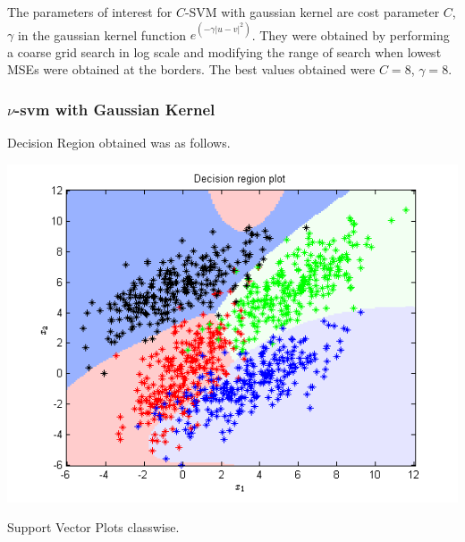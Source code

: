 \documentclass{article}
\begin{document}
The parameters of interest for $C$-SVM with gaussian kernel are cost parameter $C$, $\gamma$ in the gaussian kernel function $e^{(-\gamma|u-v|^{2})}$. They were obtained by performing a coarse grid search in log scale and modifying the range of search when lowest MSEs were obtained at the borders.
The best values obtained were $C=8$, $\gamma=8$.


\newpage

\subsubsection{$\nu$-svm with Gaussian Kernel}
Decision Region obtained was as follows.
\begin{center}
\includegraphics[scale=.8]{Classification/1c/nu_g/dec}
\end{center}
Support Vector Plots classwise.
\end{document}
